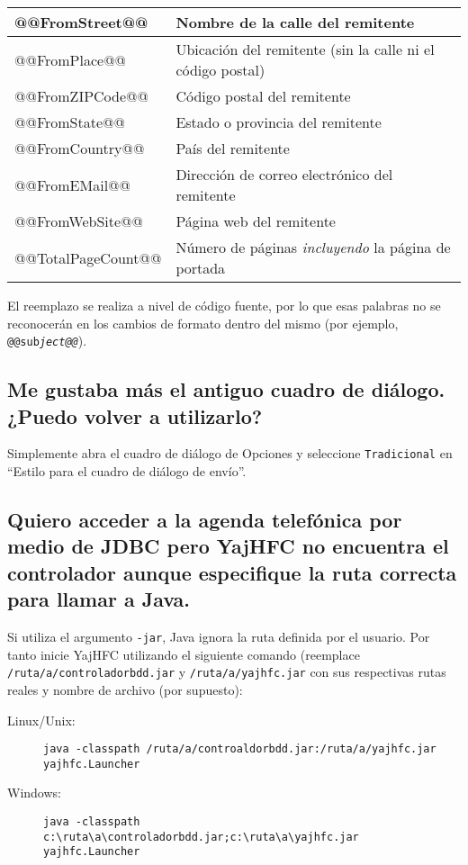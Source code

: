 \documentclass[a4paper,10pt]{scrartcl}
\begin{document}
\begin{center}
\begin{tabular}{|l|p{}|}
\ttfamily @@FromStreet@@ & Nombre de la calle del remitente \\\hline
\ttfamily @@FromPlace@@ & Ubicación del remitente (sin la calle ni el código postal)\\\hline
\ttfamily @@FromZIPCode@@ & Código postal del remitente \\\hline
\ttfamily @@FromState@@ & Estado o provincia del remitente\\\hline
\ttfamily @@FromCountry@@ & País del remitente\\\hline
\ttfamily @@FromEMail@@ & Dirección de correo electrónico del remitente\\\hline
\ttfamily @@FromWebSite@@ & Página web del remitente\\\hline
\ttfamily @@TotalPageCount@@ & Número de páginas \textit{incluyendo} la página de portada \\\hline
\end{tabular}
\end{center}

El reemplazo se realiza a nivel de código fuente, por lo que esas palabras no se reconocerán en los cambios de formato dentro del mismo (por ejemplo, \texttt{@@sub\textit{ject@@}}).

\subsection{Me gustaba más el antiguo cuadro de diálogo. ¿Puedo volver a utilizarlo?}

Simplemente abra el cuadro de diálogo de Opciones y seleccione \texttt{Tradicional} en ``Estilo para el cuadro de diálogo de envío''.

\subsection{Quiero acceder a la agenda telefónica por medio de JDBC pero YajHFC no encuentra el controlador aunque especifique la ruta correcta para llamar a Java.}

Si utiliza el argumento \texttt{-jar}, Java ignora la ruta definida por el usuario.
Por tanto inicie YajHFC utilizando el siguiente comando (reemplace \texttt{/ruta/a/controladorbdd.jar} y \texttt{/ruta/a/yajhfc.jar} con sus respectivas rutas reales y nombre de archivo (por supuesto):
\begin{description}
\item [Linux/Unix:] \verb#java -classpath /ruta/a/controaldorbdd.jar:/ruta/a/yajhfc.jar yajhfc.Launcher#
\item [Windows:] \verb#java -classpath c:\ruta\a\controladorbdd.jar;c:\ruta\a\yajhfc.jar yajhfc.Launcher#
\end{description}
\end{document}
